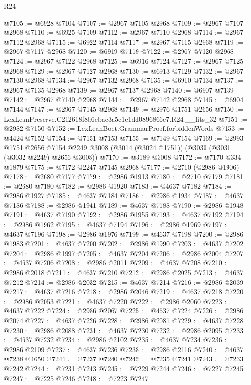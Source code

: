\begin{lexlean}{R24}
\begin{coremodule}
@7105 := @6928 @7104
@7107 := @2967 @7105 @2968
@7109 := @2967 @7107 @2968
@7110 := @6925 @7109
@7112 := @2967 @7110 @2968
@7114 := @2967 @7112 @2968
@7115 := @6922 @7114
@7117 := @2967 @7115 @2968
@7119 := @2967 @7117 @2968
@7120 := @6919 @7119
@7122 := @2967 @7120 @2968
@7124 := @2967 @7122 @2968
@7125 := @6916 @7124
@7127 := @2967 @7125 @2968
@7129 := @2967 @7127 @2968
@7130 := @6913 @7129
@7132 := @2967 @7130 @2968
@7134 := @2967 @7132 @2968
@7135 := @6910 @7134
@7137 := @2967 @7135 @2968
@7139 := @2967 @7137 @2968
@7140 := @6907 @7139
@7142 := @2967 @7140 @2968
@7144 := @2967 @7142 @2968
@7145 := @6904 @7144
@7147 := @2967 @7145 @2968
@7149 := @2976 @1751 @2656
@7150 := LexLeanPreserve.C212618f8b6ebac3a5c1e1dd0896866e7.R24.__fits_32
@7151 := @2982 @7150
@7152 := LexLeanBoot.GrammarProof.forbiddenWords
@7153 := @4424 @7152
@7154 := @7151 @7153
@7155 := @7149 @7154
@7169 := @2993
    @1751
    @2656
    @7154
    @2249
    @3008
    (@3014 (@3024 @1751))
    (@3030 (@3031 (@3032 @2249) @2656 @3008))
@7170 := @3189 @3008
@7172 := @7170 @334 @1879
@7175 := @7172 @2247 @7145 @2968
@7177 := @2710 (@2986 @1906)
@7178 := @2680 @7177
@7179 := @2986 @1913
@7180 := @2710 @7179
@7181 := @2680 @7180
@7182 := @2986 @1920
@7183 := @4637 @7182
@7184 := @2986 @1927
@7185 := @4637 @7184
@7186 := @2986 @1934
@7187 := @4637 @7186
@7188 := @2986 @1941
@7189 := @4637 @7188
@7190 := @2986 @1948
@7191 := @4637 @7190
@7192 := @2986 @1955
@7193 := @4637 @7192
@7194 := @2986 @1962
@7195 := @4637 @7194
@7196 := @2986 @1969
@7197 := @4637 @7196
@7198 := @2986 @1976
@7199 := @4637 @7198
@7200 := @2986 @1983
@7201 := @4637 @7200
@7202 := @2986 @1990
@7203 := @4637 @7202
@7204 := @2986 @1997
@7205 := @4637 @7204
@7206 := @2986 @2004
@7207 := @4637 @7206
@7208 := @2986 @2011
@7209 := @4637 @7208
@7210 := @2986 @2018
@7211 := @4637 @7210
@7212 := @2986 @2025
@7213 := @4637 @7212
@7214 := @2986 @2032
@7215 := @4637 @7214
@7216 := @2986 @2039
@7217 := @4637 @7216
@7218 := @2986 @2046
@7219 := @4637 @7218
@7220 := @2986 @2053
@7221 := @4637 @7220
@7222 := @2986 @2060
@7223 := @4637 @7222
@7224 := @2986 @2067
@7225 := @4637 @7224
@7226 := @2986 @2074
@7227 := @4637 @7226
@7228 := @2986 @2081
@7229 := @4637 @7228
@7230 := @2986 @2088
@7231 := @4637 @7230
@7232 := @2986 @2095
@7233 := @4637 @7232
@7234 := @2986 @2102
@7235 := @4637 @7234
@7236 := @2986 @2109
@7237 := @4637 @7236
@7238 := @2986 @2116
@7240 := @4637 @7238 @4650
@7241 := @7237 @7240
@7242 := @7235 @7241
@7243 := @7233 @7242
@7244 := @7231 @7243
@7245 := @7229 @7244
@7246 := @7227 @7245
@7247 := @7225 @7246
@7248 := @7223 @7247

\end{coremodule}
\end{lexlean}
